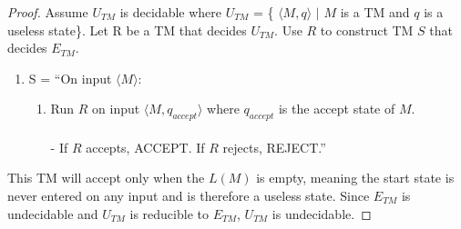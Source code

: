 \documentclass{article}
\begin{document}
\begin{proof}  
    Assume $U_{TM}$ is decidable where $U_{TM}$ = \{ $\langle M, q \rangle$  $|$ $M$ is a TM and $q$ is a useless state\}. Let R be a TM that decides $U_{TM}$. Use $R$ to construct TM $S$ that decides $E_{TM}$.
    \begin{enumerate}
    \item S = ``On input $\langle M \rangle$:
    \begin{enumerate} [1.]
    \item Run $R$ on input $\langle M, q_{accept} \rangle$ where $q_{accept}$ is the accept state of $M$.
    \\ \\ - If $R$ accepts, ACCEPT. If $R$ rejects, REJECT.''
    \end{enumerate}
\end{enumerate}

This TM will accept only when the $L(M)$ is empty, meaning the start state is never entered on any input and is therefore a useless state. Since $E_{TM}$ is undecidable and $U_{TM}$ is reducible to $E_{TM}$, $U_{TM}$ is undecidable.   

\end{proof}
 
 
    

    \begin{comment}
    \begin{proof}  
    
    Assume, $U_{TM}$ is decidable. Let R = the TM that decides $U_{TM}$.
    \\S = TM that decides $E_{TM}$
    \\Proof by contradiction\\
    $HALT_{TM}$ = \{$\langle M,W \rangle$ \;|\; M halts on W \} $U_{TM} \leq_m HALT_{TM}$
    \\-Assume $U_{TM}$ is decidable. Let R = decider for $U_{TM}$
    \\-Construct S that decides $HALT_{TM} using R$.
    S=``On input $\langle M,W \rangle$:
    \begin{enumerate}
    \item Run R n $\langle M, q_{accept} \rangle$ $q_{accept} \in S$
    \\-If R accepts, S accepts
    \\-If R rejects, Reject"
    \end{enumerate}
    Because $U_{TM}$ is reducible to $HALT_{TM}$,  and $HALT_{TM}$ is undecidable, $U_{TM} is undecidable$.
    \end{proof}
    -------------------------------------------
    \end{comment}
    
\end{document}

